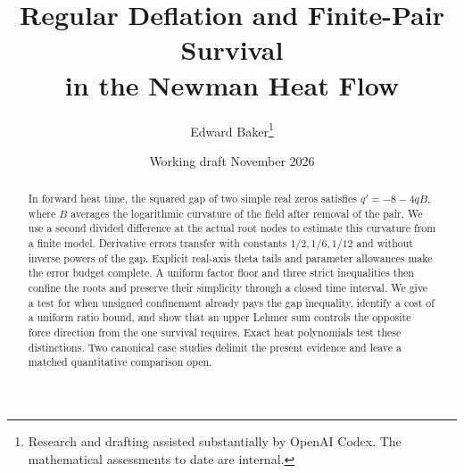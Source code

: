 \documentclass[11pt]{article}
\title{Regular Deflation and Finite-Pair Survival\\in the Newman Heat Flow}
\author{Edward Baker\thanks{Research and drafting assisted substantially by
OpenAI Codex. The mathematical assessments to date are internal.}}
\date{Working draft \quad 9 November 2026}
\numberwithin{equation}{section}
\theoremstyle{remark}
\begin{document}
\maketitle
\begin{abstract}
In forward heat time, the squared gap of two simple real zeros satisfies
\(q'=-8-4qB\), where \(B\) averages the logarithmic curvature of the
field after removal of the pair. We use a second divided difference at
the actual root nodes to estimate this curvature from a finite model.
Derivative errors transfer with constants \(1/2,1/6,1/12\) and without
inverse powers of the gap. Explicit real-axis theta tails and parameter
allowances make the error budget complete. A uniform factor floor and
three strict inequalities then confine the roots and preserve their
simplicity through a closed time interval. We give a test for when
unsigned confinement already pays the gap inequality, identify a cost
of a uniform ratio bound, and show that an upper Lehmer sum controls
the opposite force direction from the one survival requires. Exact heat
polynomials test these distinctions. Two canonical case studies delimit
the present evidence and leave a matched quantitative comparison open.
\end{abstract}








\end{document}
